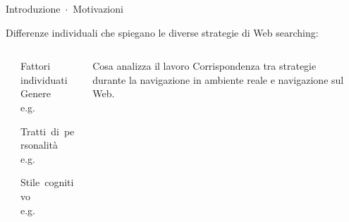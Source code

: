 

\begin{frame}[plain]{\alert{Introduzione}~$\cdot$~Motivazioni}
\label{frm:intro:1}

  Differenze individuali che spiegano le diverse strategie di Web searching:

  \begin{columns}[t]
    \begin{column}{0.025\linewidth}\end{column}

    \begin{column}{0.475\linewidth}

      \begin{block}{Fattori individuati}
        \alert{Genere} \\ {\scriptsize e.g.~\parencite{smith2001men}}
        \vspace{0.25cm}

        \alert{Tratti~di~personalità} \\ {\scriptsize e.g.~\parencite{amichai2010social}}
        \vspace{0.25cm}

        \alert{Stile~cognitivo} \\ {\scriptsize e.g.~\parencite{kinley2010impact}}
      \end{block}

    \end{column}

    \begin{column}{0.475\linewidth}

      \begin{block}{Cosa analizza il lavoro}
        Corrispondenza tra strategie durante la navigazione in ambiente reale e navigazione sul Web.
      \end{block}

    \end{column}

    \begin{column}{0.025\linewidth}\end{column}

  \end{columns}
\end{frame}

